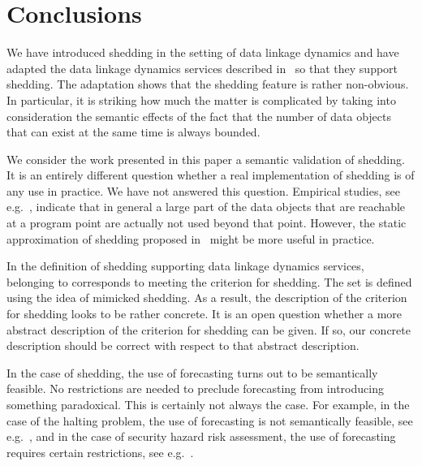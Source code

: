 \documentclass[fleqn]{llncs}
\begin{document}
\section{Conclusions}
\label{sect-concl}

We have introduced shedding in the setting of data linkage dynamics and
have adapted the data linkage dynamics services described
in~\cite{BM08d} so that they support shedding.
The adaptation shows that the shedding feature is rather non-obvious.
In particular, it is striking how much the matter is complicated by
taking into consideration the semantic effects of the fact that the
number of data objects that can exist at the same time is always
bounded.

We consider the work presented in this paper a semantic validation of
shedding.
It is an entirely different question whether a real implementation of
shedding is of any use in practice.
We have not answered this question.
Empirical studies, see e.g.~\cite{HDH02a}, indicate that in general a
large part of the data objects that are reachable at a program point are
actually not used beyond that point.
However, the static approximation of shedding proposed in~\cite{KSK07a}
might be more useful in practice.

In the definition of shedding supporting data linkage dynamics services,
belonging to  corresponds to meeting the criterion for shedding.
The set  is defined using the idea of mimicked shedding.
As a result, the description of the criterion for shedding looks to be
rather concrete.
It is an open question whether a more abstract description of the
criterion for shedding can be given.
If so, our concrete description should be correct with respect to that
abstract description.

In the case of shedding, the use of forecasting turns out to be
semantically feasible.
No restrictions are needed to preclude forecasting from introducing
something paradoxical.
This is certainly not always the case.
For example, in the case of the halting problem, the use of forecasting
is not semantically feasible, see e.g.~\cite{BP04a}, and in the case of
security hazard risk assessment, the use of forecasting requires certain
restrictions, see e.g.~\cite{BBP07a}.



\end{document}

